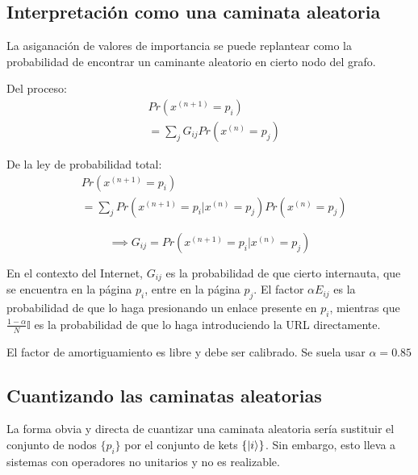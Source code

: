 \documentclass[11pt, spanish]{report}
\begin{document}
\subsection{Interpretación como una caminata aleatoria}

La asiganación de valores de importancia se puede replantear como la probabilidad de encontrar un caminante aleatorio en cierto nodo del grafo.

\begin{minipage}{0.5\linewidth}
Del proceso:
\begin{align*}
& Pr(x^{(n+1)}=p_i) \\
& =\sum\limits_j G_{i j} Pr(x^{(n)}=p_j)
\end{align*}
\end{minipage}
\begin{minipage}{0.5\linewidth}
De la ley de probabilidad total:
\begin{align*}
& Pr(x^{(n+1)}=p_i) \\
& =\sum\limits_j Pr(x^{(n+1)}=p_i|x^{(n)}=p_j) Pr(x^{(n)}=p_j)
\end{align*}
\end{minipage}
\[
\implies G_{i j} = Pr(x^{(n+1)}=p_i | x^{(n)}=p_j)
\]

En el contexto del Internet, $G_{i j}$ es la probabilidad de que cierto internauta, que se encuentra en la página $p_i$, entre en la página $p_j$. El factor $\alpha E_{i j}$ es la probabilidad de que lo haga presionando un enlace presente en $p_i$, mientras que $\frac{1-\alpha}{N} \mathds{I}$ es la probabilidad de que lo haga introduciendo la URL directamente.

El factor de amortiguamiento es libre y debe ser calibrado. Se suela usar $\alpha = 0.85$

\subsection{Cuantizando las caminatas aleatorias}

La forma obvia y directa de cuantizar una caminata aleatoria sería sustituir el conjunto de nodos $\{p_i\}$ por el conjunto de kets $\{\ket{i}\}$. Sin embargo, esto lleva a sistemas con operadores no unitarios y no es realizable.
\end{document}
